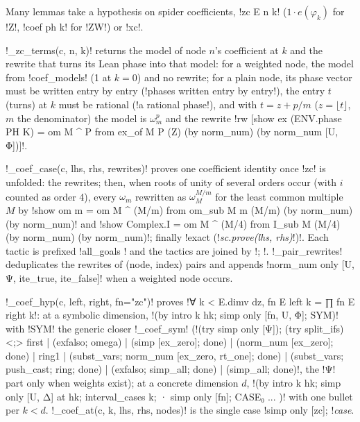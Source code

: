 {Many lemmas take a hypothesis on spider coefficients, \lean!zc E n k! ($1\cdot e(\varphi_k)$ for
\code!Z!, \lean!coef ph k! for \code!ZW!) or \lean!xc!.

\py!_zc_terms(c, n, k)! returns the model of node $n$'s coefficient at $k$ and the rewrite that
turns its Lean phase into that model: for a weighted node, the model from \py!coef_models! (1 at
$k=0$) and no rewrite; for a plain node, its phase vector must be written entry by entry
(\code!phases written entry by entry!), the entry $t$ (turns) at $k$ must be rational
(\code!a rational phase!), and with $t = z + p/m$ ($z = \lfloor t\rfloor$, $m$ the denominator)
the model is $\omega_m^{p}$ and the rewrite
\leanx!rw [show ex (ENV.phase PH K) = om M ^ P from ex_of M P (Z) (by norm_num) (by norm_num [U, Φ])]!.

\py!_coef_case(c, lhs, rhs, rewrites)! proves one coefficient identity once \lean!zc! is
unfolded: the rewrites; then, when roots of unity of several orders occur (with $i$ counted as
order 4), every $\omega_m$ rewritten as $\omega_M^{M/m}$ for the least common multiple $M$ by
\code!show om m = om M ^ (M/m) from om_sub M m (M/m) (by norm_num) (by norm_num)! and
\code!show Complex.I = om M ^ (M/4) from I_sub M (M/4) (by norm_num) (by norm_num)!; finally
\code!exact (!\textit{sc.prove(lhs, rhs)}\code!)!. Each tactic is prefixed \code!all_goals !
and the tactics are joined by \code!; !. \py!_pair_rewrites! deduplicates the rewrites of
(node, index) pairs and appends \leanx!norm_num only [U, Ψ, ite_true, ite_false]! when a weighted
node occurs.

\py!_coef_hyp(c, left, right, fn="zc")! proves \leanx!∀ k < E.dimv dz, fn E left k = ∏ fn E right k!:
at a symbolic dimension, \leanx!(by intro k hk; simp only [fn, U, Φ]; SYM)! with \code!SYM! the
generic closer \py!_coef_sym!
(\leanx!(try simp only [Ψ]); (try split_ifs) <;> first | (exfalso; omega) | (simp [ex_zero]; done) | (norm_num [ex_zero]; done) | ring1 | (subst_vars; norm_num [ex_zero, rt_one]; done) | (subst_vars; push_cast; ring; done) | (exfalso; simp_all; done) | (simp_all; done)!,
the \leanx!Ψ! part only when weights exist); at a concrete dimension $d$,
\leanx!(by intro k hk; simp only [U, Δ] at hk; interval_cases k; · simp only [fn]; CASE₀ ... )!
with one bullet per $k<d$. \py!_coef_at(c, k, lhs, rhs, nodes)! is the single case
\code!simp only [zc]; !\textit{case}.

}
